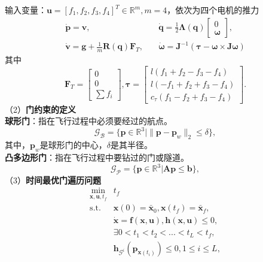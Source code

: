 输入变量：$\mathbf{u}=[f_1,f_2,f_3,f_4]^T\in \mathbb{R}^m,m=4$，依次为四个电机的推力
\begin{align}
    \dot{\mathbf{p}}  =\mathbf{v},&\quad\dot{\mathbf{q}}=\frac12\boldsymbol{\Lambda}(\mathbf{q})\left[\begin{array}{c}0\\ \boldsymbol{\omega}\end{array}\right],\\ 
    \dot{\mathbf{v}}  =\mathbf{g}+\frac1m\mathbf{R}(\mathbf{q})\mathbf{F}_{T},&\quad\dot{\boldsymbol{\omega}}=\mathbf{J}^{-1}(\boldsymbol{\tau}-\boldsymbol{\omega}\times\mathbf{J}\boldsymbol{\omega})
\end{align}
其中 
\begin{equation}
    \mathbf{F}_{T}  =\left[\begin{array}{c}0\\ 0\\ \sum f_{i}\end{array}\right],\boldsymbol{\tau}=\left[\begin{array}{c}l(f_1+f_2-f_3-f_4)\\ l(-f_1+f_2+f_3-f_4)\\ c_{\tau}(f_1-f_2+f_3-f_4)\end{array}\right].
\end{equation}
（2）\textbf{门约束的定义}\\
\textbf{球形门}：指在飞行过程中必须要经过的航点。
\begin{equation}
    \mathcal{G}_{\mathcal{B}}=\{\mathbf{p}\in\mathbb{R}^3|\|\mathbf{p}-\mathbf{p}_w\|_2\leq\delta\},
\end{equation}
其中，$\mathbf{p}_w$是球形门的中心，$\delta$是其半径。\\
\textbf{凸多边形门}：指在飞行过程中要钻过的门或隧道。
\begin{equation}
    \mathcal{G}_{\mathcal{P}}=\{\mathbf{p}\in\mathbb{R}^3|\mathbf{A}\mathbf{p}\leq\mathbf{b}\},
\end{equation}
（3）\textbf{时间最优门遍历问题}
\begin{align}
\min_{\mathbf{x},\mathbf{u},t_f}& t_{f} \\
\mathrm{s.t.}& \mathbf{x}(0)=\bar{\mathbf{x}}_0, \mathbf{x}(t_f)=\bar{\mathbf{x}}_f, \\
&\dot{\mathbf{x}}=\mathbf{f}(\mathbf{x},\mathbf{u}), \mathbf{h}(\mathbf{x},\mathbf{u})\leq0, \\
&\exists 0<t_{1}<t_{2}<...<t_{L}<t_{f}, \\
&\mathbf{h}_{\mathcal{G}^{i}}(\mathbf{p}_{\mathbf{x}(t_{i})})\leq0, 1\leq i\leq L,
\end{align}
